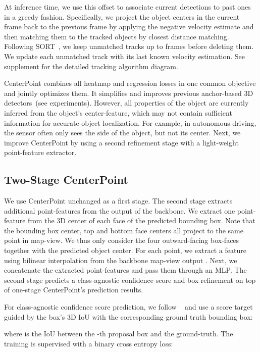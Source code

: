 \documentclass[final]{cvpr}
\begin{document}
At inference time, we use this offset to associate current detections to past ones in a greedy fashion.
Specifically, we project the object centers in the current frame back to the previous frame by applying the negative velocity estimate and then matching them to the tracked objects by closest distance matching.
Following SORT~\cite{sort}, we keep unmatched tracks up to  frames before deleting them.
We update each unmatched track with its last known velocity estimation. 
See supplement for the detailed tracking algorithm diagram.

CenterPoint combines all heatmap and regression losses in one common objective and jointly optimizes them.
It
simplifies and improves previous anchor-based 3D detectors~(see experiments).
However, all properties of the object 
are currently inferred from the object's center-feature, 
which may not contain sufficient information for accurate object localization.
For example, in autonomous driving, the sensor often only sees the side of the object, but not its center.
Next, we improve CenterPoint by using a second refinement stage with a light-weight point-feature extractor.

\subsection{Two-Stage CenterPoint}
We use CenterPoint unchanged as a first stage.
The second stage extracts additional point-features from the output of the backbone.
We extract one point-feature from the 3D center of each face of the predicted bounding box.
Note that the bounding box center, top and bottom face centers all project to the same point in map-view.
We thus only consider the four outward-facing box-faces together with the predicted object center.
For each point, we extract a feature using bilinear interpolation from the backbone map-view output .
Next, we concatenate the extracted point-features and pass them through an MLP.
The second stage predicts a class-agnostic confidence score and box refinement on top of one-stage CenterPoint's prediction results. 

For class-agnostic confidence score prediction, we follow ~\cite{pvrcnn, PartA, li2019gs3d, jiang2018acquisition} and use a score target  guided by the box's 3D IoU with the corresponding ground truth bounding box:

\noindent 
where  is the IoU between the -th proposal box and the ground-truth. 
The training is supervised with a binary cross entropy loss:
\end{document}
